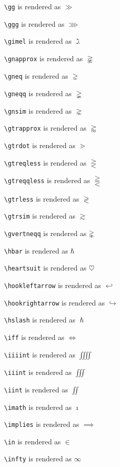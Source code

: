 \texttt{\textbackslash gg} is rendered as $\gg$

\texttt{\textbackslash ggg} is rendered as $\ggg$

\texttt{\textbackslash gimel} is rendered as $\gimel$

\texttt{\textbackslash gnapprox} is rendered as $\gnapprox$

\texttt{\textbackslash gneq} is rendered as $\gneq$

\texttt{\textbackslash gneqq} is rendered as $\gneqq$

\texttt{\textbackslash gnsim} is rendered as $\gnsim$

\texttt{\textbackslash gtrapprox} is rendered as $\gtrapprox$

\texttt{\textbackslash gtrdot} is rendered as $\gtrdot$

\texttt{\textbackslash gtreqless} is rendered as $\gtreqless$

\texttt{\textbackslash gtreqqless} is rendered as $\gtreqqless$

\texttt{\textbackslash gtrless} is rendered as $\gtrless$

\texttt{\textbackslash gtrsim} is rendered as $\gtrsim$

\texttt{\textbackslash gvertneqq} is rendered as $\gvertneqq$

\texttt{\textbackslash hbar} is rendered as $\hbar$

\texttt{\textbackslash heartsuit} is rendered as $\heartsuit$

\texttt{\textbackslash hookleftarrow} is rendered as $\hookleftarrow$

\texttt{\textbackslash hookrightarrow} is rendered as $\hookrightarrow$

\texttt{\textbackslash hslash} is rendered as $\hslash$

\texttt{\textbackslash iff} is rendered as $\iff$

\texttt{\textbackslash iiiint} is rendered as $\iiiint$

\texttt{\textbackslash iiint} is rendered as $\iiint$

\texttt{\textbackslash iint} is rendered as $\iint$

\texttt{\textbackslash imath} is rendered as $\imath$

\texttt{\textbackslash implies} is rendered as $\implies$

\texttt{\textbackslash in} is rendered as $\in$

\texttt{\textbackslash infty} is rendered as $\infty$

